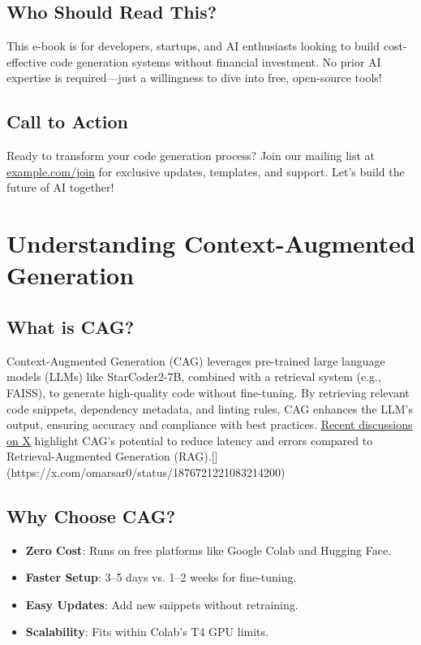 \documentclass[12pt]{article}
\begin{document}
\subsection{Who Should Read This?}
This e-book is for developers, startups, and AI enthusiasts looking to build cost-effective code generation systems without financial investment. No prior AI expertise is required—just a willingness to dive into free, open-source tools!

\subsection{Call to Action}
Ready to transform your code generation process? Join our mailing list at \href{https://example.com/join}{example.com/join} for exclusive updates, templates, and support. Let’s build the future of AI together!

\section{Understanding Context-Augmented Generation}
\subsection{What is CAG?}
Context-Augmented Generation (CAG) leverages pre-trained large language models (LLMs) like StarCoder2-7B, combined with a retrieval system (e.g., FAISS), to generate high-quality code without fine-tuning. By retrieving relevant code snippets, dependency metadata, and linting rules, CAG enhances the LLM's output, ensuring accuracy and compliance with best practices. \href{https://x.com/omarsar0/status/1745131234567890}{Recent discussions on X} highlight CAG’s potential to reduce latency and errors compared to Retrieval-Augmented Generation (RAG).[](https://x.com/omarsar0/status/1876721221083214200)

\subsection{Why Choose CAG?}
\begin{itemize}
  \item \textbf{Zero Cost}: Runs on free platforms like Google Colab and Hugging Face.
  \item \textbf{Faster Setup}: 3–5 days vs. 1–2 weeks for fine-tuning.
  \item \textbf{Easy Updates}: Add new snippets without retraining.
  \item \textbf{Scalability}: Fits within Colab’s T4 GPU limits.
\end{itemize}
\end{document}
